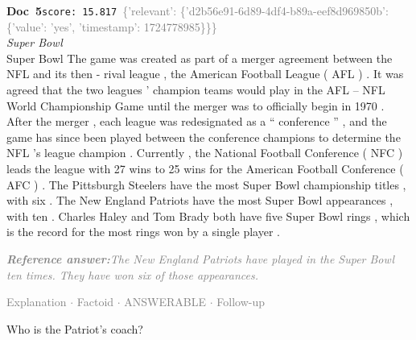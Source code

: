 \documentclass[a4paper,11pt]{article}
\begin{document}
\begin{docenv}
{\footnotesize\textcolor{doccolor}{\textbf{Doc~5}}}\hfill{\tiny\texttt{score:~15.817}}\ {\tiny\textcolor{gray}{\{'relevant': \{'d2b56e91-6d89-4df4-b89a-eef8d969850b': \{'value': 'yes', 'timestamp': 1724778985\}\}\}}}\\[3pt]
{\small\textit{Super Bowl}}\\[2pt]
\vspace{2pt}
{\footnotesize Super Bowl
The game was created as part of a merger agreement between the NFL and its then - rival league , the American Football League ( AFL ) . It was agreed that the two leagues ' champion teams would play in the AFL -- NFL World Championship Game until the merger was to officially begin in 1970 . After the merger , each league was redesignated as a `` conference '' , and the game has since been played between the conference champions to determine the NFL 's league champion . Currently , the National Football Conference ( NFC ) leads the league with 27 wins to 25 wins for the American Football Conference ( AFC ) . The Pittsburgh Steelers have the most Super Bowl championship titles , with six . The New England Patriots have the most Super Bowl appearances , with ten . Charles Haley and Tom Brady both have five Super Bowl rings , which is the record for the most rings won by a single player .}
\end{docenv}
\begin{refanswerenv}
{\footnotesize\textit{\textcolor{gray}{\textbf{Reference answer:}\enspace The New England Patriots have played in the Super Bowl ten times. They have won six of those appearances.}}}
\end{refanswerenv}
\vspace{0.5em}
\hfill{\tiny\textcolor{gray}{Explanation $\cdot$ Factoid $\cdot$ ANSWERABLE $\cdot$ Follow-up}}
\begin{userbubble}
Who is the Patriot's coach?
\end{userbubble}
\end{document}

